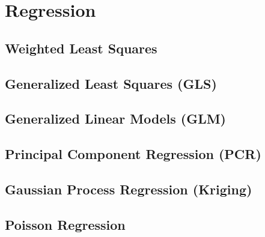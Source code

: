 \section{Regression}
\label{additional:Regression}

\subsection{Weighted Least Squares}
\label{additional:Regression:WLS}

\subsection{Generalized Least Squares (GLS)}
\label{additional:Regression:GLS}

\subsection{Generalized Linear Models (GLM)}
\label{additional:Regression:GLM}

\subsection{Principal Component Regression (PCR)}
\label{additional:Regression:PCR}

\subsection{Gaussian Process Regression (Kriging)}
\label{additional:Regression:kriging}


\subsection{Poisson Regression}
\label{additional:Regression:poisson}

